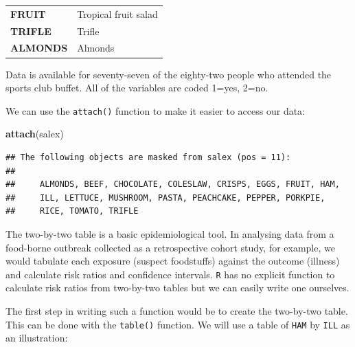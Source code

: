 \documentclass[12pt,a4paper]{book}
\newenvironment{Shaded}{\begin{snugshade}}{\end{snugshade}}
\newcommand{\KeywordTok}[1]{\textcolor[rgb]{0.13,0.29,0.53}{\textbf{#1}}}
\newcommand{\NormalTok}[1]{#1}
\theoremstyle{definition}
\theoremstyle{definition}
\theoremstyle{definition}
\theoremstyle{remark}
\begin{document}
\begin{longtable}[]{@{}ll@{}}
\begin{minipage}[t]{0.21\columnwidth}\raggedright
\textbf{FRUIT}\strut
\end{minipage} & \begin{minipage}[t]{0.30\columnwidth}\raggedright
Tropical fruit salad\strut
\end{minipage}\tabularnewline
\begin{minipage}[t]{0.21\columnwidth}\raggedright
\textbf{TRIFLE}\strut
\end{minipage} & \begin{minipage}[t]{0.30\columnwidth}\raggedright
Trifle\strut
\end{minipage}\tabularnewline
\begin{minipage}[t]{0.21\columnwidth}\raggedright
\textbf{ALMONDS}\strut
\end{minipage} & \begin{minipage}[t]{0.30\columnwidth}\raggedright
Almonds\strut
\end{minipage}\tabularnewline
\bottomrule
\end{longtable}

Data is available for seventy-seven of the eighty-two people who
attended the sports club buffet. All of the variables are coded 1=yes,
2=no.

We can use the \texttt{attach()} function to make it easier to access
our data:

\begin{Shaded}
\begin{Highlighting}[]
\KeywordTok{attach}\NormalTok{(salex)}
\end{Highlighting}
\end{Shaded}

\begin{verbatim}
## The following objects are masked from salex (pos = 11):
## 
##     ALMONDS, BEEF, CHOCOLATE, COLESLAW, CRISPS, EGGS, FRUIT, HAM,
##     ILL, LETTUCE, MUSHROOM, PASTA, PEACHCAKE, PEPPER, PORKPIE,
##     RICE, TOMATO, TRIFLE
\end{verbatim}

The two-by-two table is a basic epidemiological tool. In analysing data
from a food-borne outbreak collected as a retrospective cohort study,
for example, we would tabulate each exposure (suspect foodstuffs)
against the outcome (illness) and calculate risk ratios and confidence
intervals. \texttt{R} has no explicit function to calculate risk ratios
from two-by-two tables but we can easily write one ourselves.

The first step in writing such a function would be to create the
two-by-two table. This can be done with the \texttt{table()} function.
We will use a table of \texttt{HAM} by \texttt{ILL} as an illustration:
\end{document}
